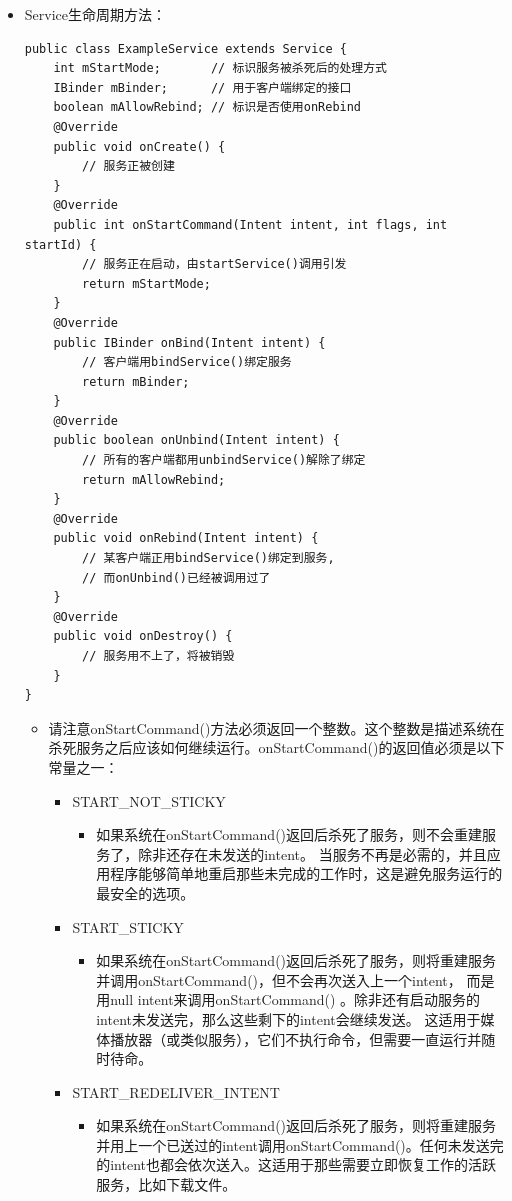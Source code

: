 \documentclass[9pt, b5paper]{article}
\begin{document}
\begin{itemize}
\item Service生命周期方法：
\begin{verbatim}
public class ExampleService extends Service {
    int mStartMode;       // 标识服务被杀死后的处理方式
    IBinder mBinder;      // 用于客户端绑定的接口
    boolean mAllowRebind; // 标识是否使用onRebind
    @Override
    public void onCreate() {
        // 服务正被创建
    }
    @Override
    public int onStartCommand(Intent intent, int flags, int startId) {
        // 服务正在启动，由startService()调用引发
        return mStartMode;
    }
    @Override
    public IBinder onBind(Intent intent) {
        // 客户端用bindService()绑定服务
        return mBinder;
    }
    @Override
    public boolean onUnbind(Intent intent) {
        // 所有的客户端都用unbindService()解除了绑定
        return mAllowRebind;
    }
    @Override
    public void onRebind(Intent intent) {
        // 某客户端正用bindService()绑定到服务,
        // 而onUnbind()已经被调用过了
    }
    @Override
    public void onDestroy() {
        // 服务用不上了，将被销毁
    }
}
\end{verbatim}
\begin{itemize}
\item 请注意onStartCommand()方法必须返回一个整数。这个整数是描述系统在杀死服务之后应该如何继续运行。onStartCommand()的返回值必须是以下常量之一：
\begin{itemize}
\item START\_NOT\_STICKY 　
\begin{itemize}
\item 如果系统在onStartCommand()返回后杀死了服务，则不会重建服务了，除非还存在未发送的intent。 当服务不再是必需的，并且应用程序能够简单地重启那些未完成的工作时，这是避免服务运行的最安全的选项。　
\end{itemize}
\item START\_STICKY 
\begin{itemize}
\item 如果系统在onStartCommand()返回后杀死了服务，则将重建服务并调用onStartCommand()，但不会再次送入上一个intent， 而是用null intent来调用onStartCommand() 。除非还有启动服务的intent未发送完，那么这些剩下的intent会继续发送。 这适用于媒体播放器（或类似服务），它们不执行命令，但需要一直运行并随时待命。　
\end{itemize}
\item START\_REDELIVER\_INTENT 
\begin{itemize}
\item 如果系统在onStartCommand()返回后杀死了服务，则将重建服务并用上一个已送过的intent调用onStartCommand()。任何未发送完的intent也都会依次送入。这适用于那些需要立即恢复工作的活跃服务，比如下载文件。

\end{itemize}
\end{itemize}
\end{itemize}
\end{itemize}
\end{document}
